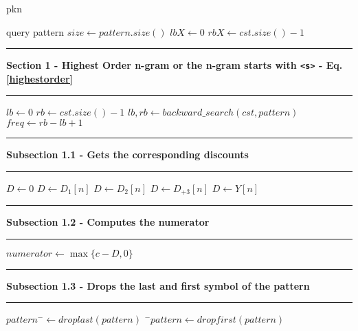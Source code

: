 \documentclass[11pt]{article}
\newcommand\Algphase[1]{%
\vspace*{-.7\baselineskip}\Statex\hspace*{\dimexpr-\algorithmicindent-2pt\relax}\rule{\textwidth}{0.1pt}%
\Statex\hspace*{-\algorithmicindent}\textbf{#1}%
\vspace*{-.7\baselineskip}\Statex\hspace*{\dimexpr-\algorithmicindent-2pt\relax}\rule{\textwidth}{0.1pt}%
}
\begin{document}
\begin{algorithm*}\footnotesize
\caption{pkn}
\begin{algorithmic}[1]
\Require query pattern
\State $size\gets pattern.size()$
\State $lbX\gets 0$
\State $rbX\gets cst.size()-1$

\Algphase{Section 1 - Highest Order n-gram or the n-gram starts with \texttt{<s>} - Eq.\ref{highestorder}}
	\State $lb\gets 0$
	\State $rb\gets cst.size()-1$
	\State $lb,rb\gets backward\_search(cst,pattern)$
	\State $freq\gets rb-lb+1$
	\Algphase{ Subsection 1.1 - Gets the corresponding discounts}
	\State $D\gets 0$
			\State $D\gets D_1[n]$
			\State $D\gets D_2[n]$
			\State $D\gets D_{+3}[n]$
		\EndIf
	\Else
		\State $D\gets Y[n]$
	\EndIf
	
    \Algphase{ Subsection 1.2 - Computes the numerator}
	\State $numerator\gets \max\{c-D,0\}$
    \Algphase{ Subsection 1.3 - Drops the last and first symbol of the pattern}
    \State $pattern^{-}\gets droplast(pattern)$
	\State $^{-}pattern\gets dropfirst(pattern)$
	

\end{algorithmic}
\end{algorithm*}
\end{document}
